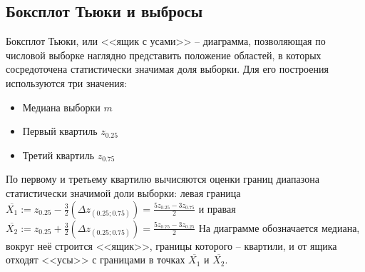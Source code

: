 \documentclass[zuev_report2.tex]{subfiles}
\begin{document}
\subsection{Боксплот Тьюки и выбросы}
Боксплот Тьюки, или <<ящик с усами>> -- диаграмма, позволяющая по числовой выборке наглядно представить положение областей, в которых сосредоточена статистически значимая доля выборки. Для его построения используются три значения:
\begin{itemize}
	\item Медиана выборки $m$
	\item Первый квартиль $z_{0.25}$
	\item Третий квартиль $z_{0.75}$
\end{itemize}
По первому и третьему квартилю вычисяются оценки границ диапазона статистически значимой доли выборки: левая граница $\overline{X_1} := z_{0.25} - \frac{3}{2}(\Delta z_{(0.25;0.75)}) = \frac{5z_{0.25}-3z_{0.75}}{2}$ и правая $\overline{X_2} := z_{0.25} + \frac{3}{2}(\Delta z_{(0.25;0.75)}) = \frac{5z_{0.75}-3z_{0.25}}{2}$
На диаграмме обозначается медиана, вокруг неё строится <<ящик>>, границы которого -- квартили, и от ящика отходят <<усы>> с границами в точках $\overline{X_1}$ и $\overline{X_2}$.\\
\end{document}
